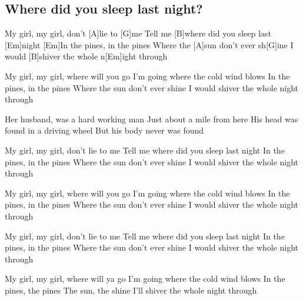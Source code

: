 \subsection*{Where did you sleep last night?   }
\begin{guitar}
[Em]My girl, my girl, don't [A]lie to [G]me
Tell me [B]where did you sleep last [Em]night
[Em]In the pines, in the pines
Where the [A]sun don't ever sh[G]ine
I would [B]shiver the whole n[Em]ight through


My girl, my girl, where will you go
I'm going where the cold wind blows
In the pines, in the pines
Where the sun don't ever shine
I would shiver the whole night through


Her husband, was a hard working man
Just about a mile from here
His head was found in a driving wheel 
But his body never was found


My girl, my girl, don't lie to me
Tell me where did you sleep last night
In the pines, in the pines
Where the sun don't ever shine
I would shiver the whole night through


My girl, my girl, where will you go
I'm going where the cold wind blows
In the pines, in the pines
Where the sun don't ever shine
I would shiver the whole night through


My girl, my girl, don't lie to me
Tell me where did you sleep last night
In the pines, in the pines
Where the sun don't ever shine
I would shiver the whole night through


My girl, my girl, where will ya go
I'm going where the cold wind blows
In the pines, the pines
The sun, the shine
I'll shiver the whole night through

\end{guitar}
